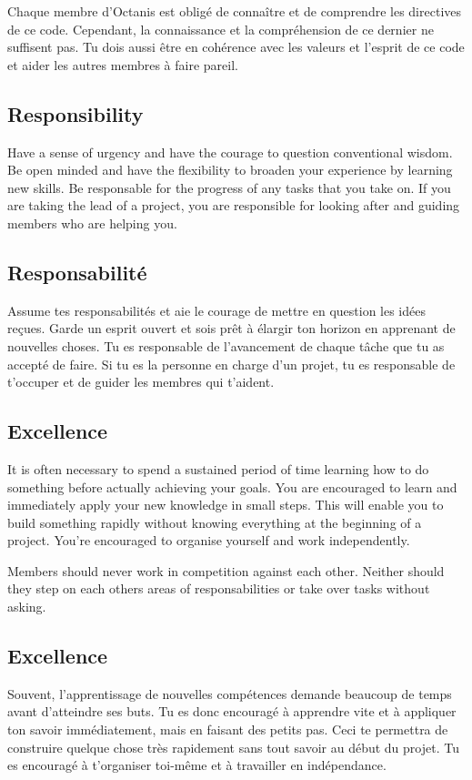 	Chaque membre d'Octanis est obligé de connaître et de comprendre les directives de ce code.
	Cependant, la connaissance et la compréhension de ce dernier ne suffisent pas. Tu dois aussi être en cohérence avec les valeurs et l'esprit de ce code et aider les autres membres à faire pareil.



	
\english
	\subsection{Responsibility}
	Have a sense of urgency and have the courage to question conventional wisdom. Be open minded and have the flexibility to broaden your experience by learning new skills. Be responsable for the progress of any tasks that you take on. If you are taking the lead of a project, you are responsible for looking after and guiding members who are helping you.



\french
	\subsection{Responsabilité}
	Assume tes responsabilités et aie le courage de mettre en question les idées reçues. Garde un esprit ouvert et sois prêt à élargir ton horizon en apprenant de nouvelles choses. Tu es responsable de l'avancement de chaque tâche que tu as accepté de faire. Si tu es la personne en charge d'un projet, tu es responsable de t'occuper et de guider les membres qui t'aident. 

\english
	\subsection{Excellence}
 	It is often necessary to spend a sustained period of time learning how to do something before actually achieving your goals. You are encouraged to learn and immediately apply your new knowledge in small steps. This will enable you to build something rapidly without knowing everything at the beginning of a project. You're encouraged to organise yourself and work independently. 
 	

	Members should never work in competition against each other. Neither should they step on each others areas of responsabilities or take over tasks without asking.

	\vspace{1cm}



\french
	\subsection{Excellence}
	Souvent, l'apprentissage de nouvelles compétences demande beaucoup de temps avant d'atteindre ses buts. Tu es donc encouragé à apprendre vite et à appliquer ton savoir immédiatement, mais en faisant des petits pas. Ceci te permettra de construire quelque chose très rapidement sans tout savoir au début du projet. Tu es encouragé à t'organiser toi-même et à travailler en indépendance. 

